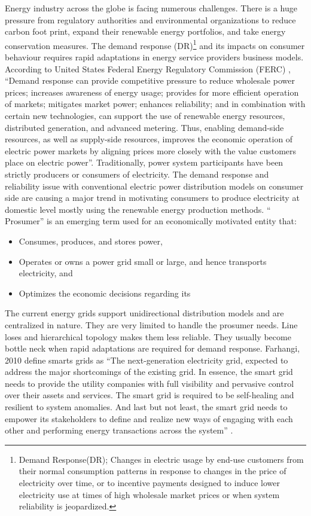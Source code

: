 Energy industry across the globe is facing numerous challenges. There is a huge pressure from regulatory authorities and environmental organizations to reduce carbon foot print, expand their renewable energy portfolios, and take energy conservation measures. The demand response (DR)\footnote{Demand Response(DR); Changes in electric usage by end-use customers from their normal consumption patterns in response to changes in the price of electricity over time, or to incentive payments designed to induce lower electricity use at times of high wholesale market prices or when system reliability is jeopardized.} and its impacts on consumer behaviour requires rapid adaptations in energy service providers business models. According to United States Federal Energy Regulatory Commission (FERC) , ``Demand response can provide competitive pressure to reduce wholesale power prices; increases awareness of energy usage; provides for more efficient operation of markets; mitigates market power; enhances reliability; and in combination with certain new technologies, can support the use of renewable energy resources, distributed generation, and advanced metering. Thus, enabling demand-side resources, as well as supply-side resources, improves the economic operation of electric power markets by aligning prices more closely with the value customers place on electric power''\cite{federal2008assessment}.  
Traditionally, power system participants have been strictly producers or consumers of electricity. The demand response and reliability issue with conventional electric power distribution models on consumer side are causing a major trend in motivating consumers to produce electricity at domestic level mostly using the renewable energy production methods.  `` Prosumer'' is an emerging term used for an economically motivated entity that: \cite{grijalva2011prosumer}
\begin{itemize}
\item Consumes, produces, and stores power,
\item Operates or owns a power grid small or large, and hence transports electricity, and
\item Optimizes the economic decisions regarding its
\end{itemize}

The current energy grids support unidirectional distribution models and are centralized in nature.  They are very limited to handle the prosumer needs. Line loses and hierarchical topology makes them less reliable. They usually become bottle neck when rapid adaptations are required for demand response. Farhangi, 2010 define smarts grids as ``The next-generation electricity grid, expected to address the major shortcomings of the existing grid. In essence, the smart grid needs to provide the utility companies with full visibility and pervasive control over their assets and services. The smart grid is required to be self-healing and resilient to system anomalies. And last but not least, the smart grid needs to empower its stakeholders to define and realize new ways of engaging with each other and performing energy transactions across the system'' \cite{farhangi2010path}.

